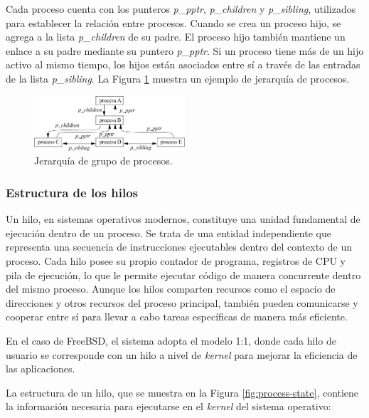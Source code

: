 Cada proceso cuenta con los punteros \textit{p\_pptr}, \textit{p\_children} y \textit{p\_sibling}, utilizados para establecer la relación entre procesos. Cuando se crea un proceso hijo, se agrega a la lista \textit{p\_children} de su padre. El proceso hijo también mantiene un enlace a su padre mediante su puntero \textit{p\_pptr}. Si un proceso tiene más de un hijo activo al mismo tiempo, los hijos están asociados entre sí a través de las entradas de la lista \textit{p\_sibling}. La Figura \ref{fig:process-hierarchy} muestra un ejemplo de jerarquía de procesos.

\begin{figure}[H]
    \centering
    \includegraphics[width=0.5\textwidth]{./images/process-hierarchy.jpeg}
    \caption{Jerarquía de grupo de procesos.}
    \label{fig:process-hierarchy}
\end{figure}


\subsubsection{Estructura de los hilos}
Un hilo, en sistemas operativos modernos, constituye una unidad fundamental de ejecución dentro de un proceso. Se trata de una entidad independiente que representa una secuencia de instrucciones ejecutables dentro del contexto de un proceso. Cada hilo posee su propio contador de programa, registros de CPU y pila de ejecución, lo que le permite ejecutar código de manera concurrente dentro del mismo proceso. Aunque los hilos comparten recursos como el espacio de direcciones y otros recursos del proceso principal, también pueden comunicarse y cooperar entre sí para llevar a cabo tareas específicas de manera más eficiente.\par

En el caso de FreeBSD, el sistema adopta el modelo 1:1, donde cada hilo de usuario se corresponde con un hilo a nivel de \textit{kernel} para mejorar la eficiencia de las aplicaciones.\par

La estructura de un hilo, que se muestra en la Figura \ref{fig:process-state}, contiene la información necesaria para ejecutarse en el \textit{kernel} del sistema operativo:

